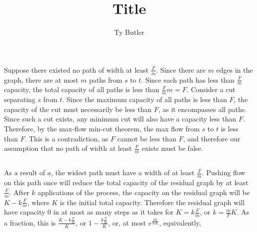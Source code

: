 \documentclass{article}
\title{Title}
\author{Ty Butler}
\begin{document}
\maketitle{}

\section{}
\subsection{}
Suppose there existed no path of width at least $\frac{F}{m}$. Since there are $m$ edges in the graph, there are at most $m$ paths from $s$ to $t$. Since each path has less than $\frac{F}{m}$ capacity, the total capacity of all paths is less than $\frac{F}{m} m = F$. Consider a cut separating $s$ from $t$. Since the maximum capacity of all paths is less than $F$, the capacity of the cut must necessarily be less than $F$, as it encompasses all paths. Since such a cut exists, any minimum cut will also have a capacity less than $F$. Therefore, by the max-flow min-cut theorem, the max flow from $s$ to $t$ is less than $F$. This is a contradiction, as $F$ cannot be less than $F$, and therefore our assumption that no path of width at least $\frac{F}{m}$ exists must be false. 

\subsection{}
As a result of $a$, the widest path must have a width of at least $\frac{F}{m}$. Pushing flow on this path once will reduce the total capacity of the residual graph by at least $\frac{F}{m}$. After $k$ applications of the process, the capacity on the residual graph will be $K - k\frac{F}{m}$, where $K$ is the initial total capacity. Therefore the residual graph will have capacity $0$ in at most as many steps as it takes for $K = k\frac{F}{m}$, or $k = \frac{m}{F}K$. As a fraction, this is $\frac{K - k\frac{F}{m}}{K}$, or $1 - \frac{k\frac{F}{m}}{K}$, or, at most $e^{\frac{Fk}{mK}}$, equivalently, 
\end{document}
